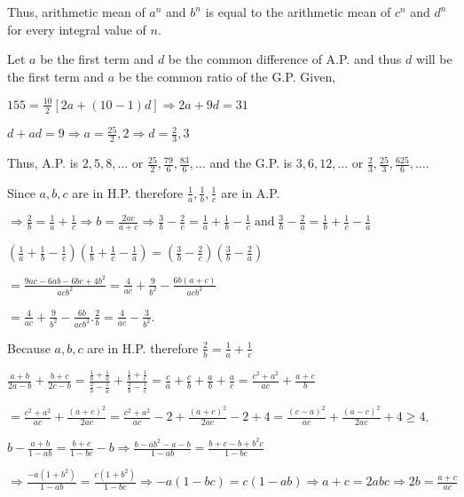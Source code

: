   Thus, arithmetic mean of $a^n$ and $b^n$ is equal to the arithmetic mean of $c^n$ and $d^n$ for every integral value of
  $n$.
\item Let $a$ be the first term and $d$ be the common difference of A.P. and thus $d$ will be the first term and $a$
  be the common ratio of the G.P. Given,

  $155 = \frac{10}{2}[2a + (10 - 1)d] \Rightarrow 2a + 9d = 31$

  $d + ad = 9\Rightarrow a = \frac{25}{2}, 2 \Rightarrow d = \frac{2}{3}, 3$

  Thus, A.P. is $2, 5, 8, \ldots$ or $\frac{25}{2}, \frac{79}{6}, \frac{83}{6}, \ldots$ and the G.P. is $3, 6, 12, \ldots$ or
  $\frac{2}{3}, \frac{25}{3}, \frac{625}{6}, \ldots$.
\item Since $a, b, c$ are in H.P. therefore $\frac{1}{a}, \frac{1}{b}, \frac{1}{c}$ are in A.P.

  $\Rightarrow \frac{2}{b} = \frac{1}{a} + \frac{1}{c} \Rightarrow b = \frac{2ac}{a + c} \Rightarrow \frac{3}{b} - \frac{2}{c} =
  \frac{1}{a} + \frac{1}{b} - \frac{1}{c} \;\text{and}\;\frac{3}{b} - \frac{2}{a} = \frac{1}{b} + \frac{1}{c}
  - \frac{1}{a}$

  $\left(\frac{1}{a} + \frac{1}{b} - \frac{1}{c}\right)\left(\frac{1}{b} + \frac{1}{c} - \frac{1}{a}\right) = \left(\frac{3}{b} -
  \frac{2}{c}\right)\left(\frac{3}{b} - \frac{2}{a}\right)$

  $= \frac{9ac - 6ab - 6bc + 4b^2}{acb^2} = \frac{4}{ac} + \frac{9}{b^2} - \frac{6b(a + c)}{acb^2}$

  $= \frac{4}{ac} + \frac{9}{b^2} - \frac{6b}{acb^2}.\frac{2}{b}= \frac{4}{ac} - \frac{3}{b^2}$.
\item Because $a, b, c$ are in H.P. therefore $\frac{2}{b} = \frac{1}{a} + \frac{1}{c}$

  $\frac{a + b}{2a - b} + \frac{b + c}{2c - b} = \frac{\frac{1}{b} + \frac{1}{a}}{\frac{2}{b} - \frac{1}{a}} + \frac{\frac{1}{b} +
  \frac{1}{c}}{\frac{2}{b} - \frac{1}{c}} = \frac{c}{a} + \frac{c}{b} + \frac{a}{b} + \frac{a}{c} =
  \frac{c^2 + a^2}{ac} + \frac{a + c}{b}$

  $= \frac{c^2 + a^2}{ac} + \frac{(a + c)^2}{2ac} = \frac{c^2 + a^2}{ac} - 2 + \frac{(a + c)^2}{2ac} - 2 +
  4 = \frac{(c - a)^2}{ac} + \frac{(a - c)^2}{2ac} + 4 \geq 4$.
\item $b - \frac{a + b}{1 - ab} = \frac{b + c}{1 - bc} - b \Rightarrow \frac{b - ab^2 - a - b}{1 - ab} =
  \frac{b + c - b + b^2c}{1 - bc}$

  $\Rightarrow \frac{-a(1 + b^2)}{1 - ab} = \frac{c(1 + b^2)}{1 - bc}\Rightarrow -a(1 - bc) = c(1 -
  ab)\Rightarrow a + c = 2abc \Rightarrow 2b = \frac{a + c}{ac}$

